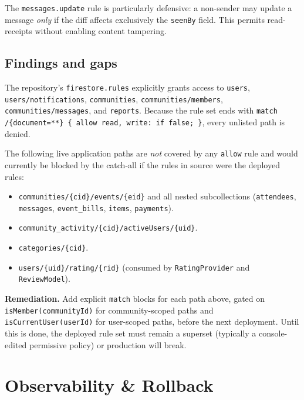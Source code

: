 \documentclass[11pt,a4paper]{article}
\begin{document}
The \texttt{messages.update} rule is particularly defensive: a non-sender
may update a message \emph{only} if the diff affects exclusively the
\texttt{seenBy} field. This permits read-receipts without enabling content
tampering.

\subsection{Findings and gaps}

The repository's \texttt{firestore.rules} explicitly grants access to
\texttt{users}, \texttt{users/notifications}, \texttt{communities},
\texttt{communities/members}, \texttt{communities/messages}, and
\texttt{reports}. Because the rule set ends with
\texttt{match /\{document=**\} \{ allow read, write: if false; \}}, every
unlisted path is denied.

The following live application paths are \emph{not} covered by any
\texttt{allow} rule and would currently be blocked by the catch-all if the
rules in source were the deployed rules:

\begin{itemize}[leftmargin=*,nosep]
  \item \texttt{communities/\{cid\}/events/\{eid\}} and all nested
        subcollections (\texttt{attendees}, \texttt{messages},
        \texttt{event\_bills}, \texttt{items}, \texttt{payments}).
  \item \texttt{community\_activity/\{cid\}/activeUsers/\{uid\}}.
  \item \texttt{categories/\{cid\}}.
  \item \texttt{users/\{uid\}/rating/\{rid\}} (consumed by
        \texttt{RatingProvider} and \texttt{ReviewModel}).
\end{itemize}

\textbf{Remediation.} Add explicit \texttt{match} blocks for each path
above, gated on \texttt{isMember(communityId)} for community-scoped paths
and \texttt{isCurrentUser(userId)} for user-scoped paths, before the next
deployment. Until this is done, the deployed rule set must remain a
superset (typically a console-edited permissive policy) or production will
break.

\section{Observability \& Rollback}
\label{sec:obs}
\end{document}
